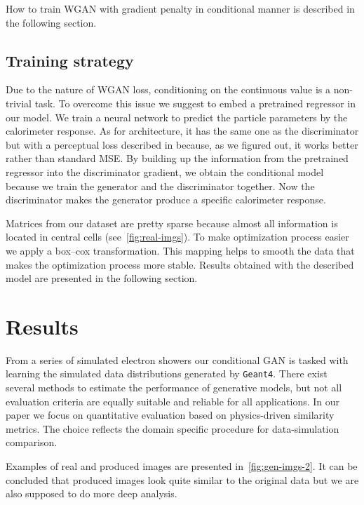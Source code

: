 \documentclass{webofc}
\begin{document}
How to train WGAN with gradient penalty in conditional manner is described in the following section.

\subsection{Training strategy} \label{sec:training_strategy}
Due to the nature of WGAN loss, conditioning on the continuous value is a non-trivial task. To overcome this issue we suggest to embed a pretrained regressor in our model. We train a neural network to predict the particle parameters by the calorimeter response. As for architecture, it has the same one as the discriminator but with a perceptual loss described in \cite{johnson2016perceptual} because, as we figured out, it works better rather than standard MSE. By building up the information from the pretrained regressor into the discriminator gradient, we obtain the conditional model because we train the generator and the discriminator together. Now the discriminator makes the generator produce a specific calorimeter response.

Matrices from our dataset are pretty sparse because almost all information is located in central cells (see~\cref{fig:real-imgs}). To make optimization process easier we apply a box--cox transformation. This mapping helps to smooth the data that makes the optimization process more stable.
Results obtained with the described model are presented in the following section.

\section{Results}
From a series of simulated electron showers our conditional GAN is tasked with learning the simulated data distributions generated by \texttt{Geant4}. There exist several methods to estimate the performance of generative models, but not all evaluation criteria are equally suitable and reliable for all applications. In our paper we focus on quantitative evaluation based on physics-driven similarity metrics. The choice reflects the domain specific procedure for data-simulation comparison. 

Examples of real and produced images are presented in~\cref{fig:gen-imgs-2}. It can be concluded that produced images look quite similar to the original data but we are also supposed to do more deep analysis.
\end{document}
